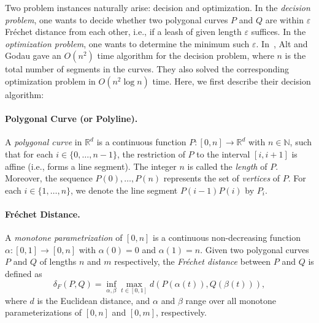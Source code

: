 \documentclass[12pt]{dalthesis}
\newcommand{\IR}{\ensuremath{\mathbb{R}}}
\newcommand{\IN}{\ensuremath{\mathbb{N}}}
\newcommand{\set}[1]{{\{ #1 \}}}
\newcommand{\eps}{\varepsilon}
\newcommand{\Frechet}{Fr\'echet }
\newcommand{\distF}{\delta_F}
\begin{document}
Two problem instances naturally arise:  decision and optimization.
In the {\em decision problem}, one wants to decide whether two polygonal curves $P$  and $Q$
are within $\eps$ \Frechet distance from each other, i.e., if a leash of given length $\eps$ suffices.
In the {\em optimization problem}, one wants to determine the minimum such $\eps$.
In~\cite{AltG95}, Alt and Godau gave an $O(n^2)$ 
time algorithm for the decision problem,
where $n$ is the total number of segments in the curves.
They also solved the corresponding optimization problem in $O(n^2\log n)$ time.
Here, we first describe their decision algorithm:


\paragraph{Polygonal Curve (or Polyline).}
A {\em polygonal curve\/} in $\IR^d$ is  a continuous function 
$P:[0,n] \rightarrow \IR^d$ with $n \in \IN$, 
such that for each $i \in \set{0, \ldots, n-1}$,
the restriction of $P$ to the interval $[i, i+1]$ 
is affine (i.e., forms a line segment).
The integer $n$ is called the {\em length\/} of $P$.
Moreover, the sequence ${P(0), \ldots, P(n)}$ represents the set of {\em vertices\/} of $P$.
For each $i \in \set{1, \ldots, n}$, 
we denote the line segment $P(i-1)P(i)$ by $P_i$.




\paragraph{\Frechet Distance.}

A {\em monotone parametrization} of $[0,n]$ 
is a continuous non-decreasing function $\alpha: [0,1] \rightarrow [0,n]$
with $\alpha(0)=0$ and $\alpha(1)=n$.
Given two polygonal curves $P$ and $Q$ of lengths $n$ and $m$ respectively, 
the {\em \Frechet distance\/} between $P$ and $Q$ is defined as
\[
	\distF(P,Q) = \inf_{\alpha, \beta} \max_{t \in [0,1]} d( P(\alpha(t)), Q(\beta(t)) ),
\]
where $d$ is the Euclidean  distance, and $\alpha$ and $\beta$ range over all monotone parameterizations of 
$[0,n]$ and $[0,m]$, respectively.
\end{document}
